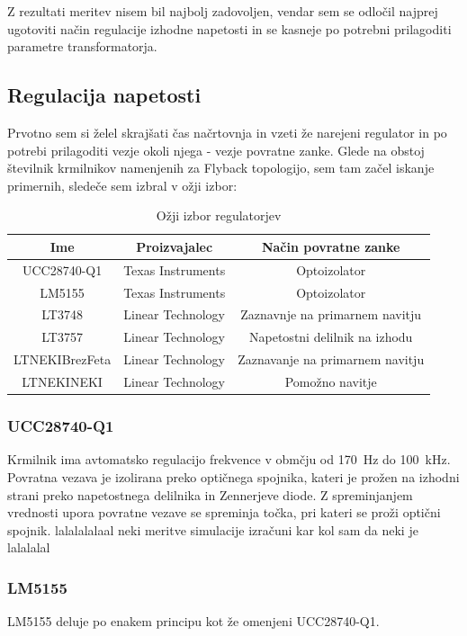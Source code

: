 \documentclass[a4paper,twoside,openright,12pt,slovene]{book}
\begin{document}
Z rezultati meritev nisem bil najbolj zadovoljen, vendar sem se odločil najprej ugotoviti način regulacije izhodne napetosti in se kasneje po potrebni prilagoditi parametre transformatorja. 

	\subsection{Regulacija napetosti} \label{RegulacijaNapetosti}
	Prvotno sem si želel skrajšati čas načrtovnja in vzeti že narejeni regulator in po potrebi prilagoditi vezje okoli njega - vezje povratne zanke. Glede na obstoj številnik krmilnikov namenjenih za Flyback topologijo, sem tam začel iskanje primernih, sledeče sem izbral v ožji izbor:
	
\begin{table}[h!]
\centering
\begin{tabular}{||c | c |c||}
\hline
Ime & Proizvajalec & Način povratne zanke \\[0.5ex]
\hline\hline
UCC28740-Q1 & Texas Instruments & Optoizolator \\
LM5155 & Texas Instruments & Optoizolator \\
LT3748 & Linear Technology & Zaznavnje na primarnem navitju \\
LT3757 & Linear Technology & Napetostni delilnik na izhodu \\
LTNEKIBrezFeta & Linear Technology & Zaznavanje na primarnem navitju \\
LTNEKINEKI & Linear Technology & Pomožno navitje \\ [1ex]
\hline
\end{tabular}
\caption{Ožji izbor regulatorjev}
\end{table}

	\subsubsection{UCC28740-Q1} \label{UCC28740-Q1}
Krmilnik ima avtomatsko regulacijo frekvence v obmčju od \SI{170}{\hertz} do \SI{100}{\kilo\hertz}. Povratna vezava je izolirana preko optičnega spojnika, kateri je prožen na izhodni strani preko napetostnega delilnika in Zennerjeve diode. Z spreminjanjem vrednosti upora povratne vezave se spreminja točka, pri kateri se proži optični spojnik. lalalalalaal neki meritve simulacije izračuni kar kol sam da neki je lalalalal

	\subsubsection{LM5155} \label{LM5155}
LM5155 deluje po enakem principu kot že omenjeni UCC28740-Q1.
\end{document}
